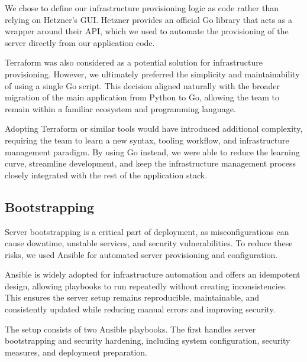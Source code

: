 We chose to define our infrastructure provisioning logic as code rather than relying on Hetzner's GUI. Hetzner provides an official Go library that acts as a wrapper around their API, which we used to automate the provisioning of the server directly from our application code.

Terraform was also considered as a potential solution for infrastructure provisioning. However, we ultimately preferred the simplicity and maintainability of using a single Go script. This decision aligned naturally with the broader migration of the main application from Python to Go, allowing the team to remain within a familiar ecosystem and programming language.

Adopting Terraform or similar tools would have introduced additional complexity, requiring the team to learn a new syntax, tooling workflow, and infrastructure management paradigm. By using Go instead, we were able to reduce the learning curve, streamline development, and keep the infrastructure management process closely integrated with the rest of the application stack.

\subsection{Bootstrapping}

Server bootstrapping is a critical part of deployment, as misconfigurations can cause downtime, unstable services, and security vulnerabilities. To reduce these risks, we used Ansible for automated server provisioning and configuration.

Ansible is widely adopted for infrastructure automation and offers an idempotent design, allowing playbooks to run repeatedly without creating inconsistencies. This ensures the server setup remains reproducible, maintainable, and consistently updated while reducing manual errors and improving security.

The setup consists of two Ansible playbooks. The first handles server bootstrapping and security hardening, including system configuration, security measures, and deployment preparation.

